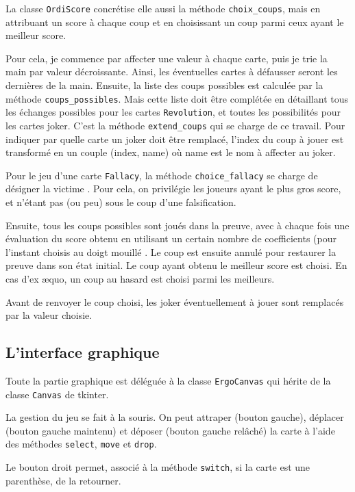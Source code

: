 \documentclass[12pt, algo]{cours}
\begin{document}
La classe \texttt{OrdiScore} concrétise elle aussi la méthode \texttt{choix\_coups}, mais en attribuant un score à chaque coup et en choisissant un coup parmi ceux ayant le meilleur score.

Pour cela, je commence par affecter une valeur à chaque carte, puis je trie la main par valeur décroissante. Ainsi, les éventuelles cartes à défausser seront les dernières de la main. Ensuite, la liste des coups possibles est calculée par la méthode \texttt{coups\_possibles}. Mais cette liste doit être complétée en détaillant tous les échanges possibles pour les cartes \texttt{Revolution}, et toutes les possibilités pour les cartes joker. C'est la méthode \texttt{extend\_coups} qui se charge de ce travail. Pour indiquer par quelle carte un joker doit être remplacé, l'index du coup à jouer est transformé en un couple (index, name) où name est le nom à affecter au joker.

Pour le jeu d'une carte \texttt{Fallacy}, la méthode \texttt{choice\_fallacy} se charge de désigner la \og victime \fg. Pour cela, on privilégie les joueurs ayant le plus gros score, et n'étant pas (ou peu) sous le coup d'une falsification.

Ensuite, tous les coups possibles sont joués dans la preuve, avec à chaque fois une évaluation du score obtenu en utilisant un certain nombre de coefficients (pour l'instant choisis au \og doigt mouillé \fg. Le coup est ensuite annulé pour restaurer la preuve dans son état initial. Le coup ayant obtenu le meilleur score est choisi. En cas d'ex \ae quo, un coup au hasard est choisi parmi les meilleurs.

Avant de renvoyer le coup choisi, les joker éventuellement à jouer sont remplacés par la valeur choisie.

\subsection{L'interface graphique}

Toute la partie graphique est déléguée à la classe \texttt{ErgoCanvas} qui hérite de la classe \texttt{Canvas} de tkinter. 

La gestion du jeu se fait à la souris. On peut attraper (bouton gauche), déplacer (bouton gauche maintenu) et déposer (bouton gauche relâché) la carte à l'aide des méthodes \texttt{select}, \texttt{move} et \texttt{drop}.

Le bouton droit permet, associé à la méthode \texttt{switch}, si la carte est une parenthèse, de la retourner.
\end{document}
